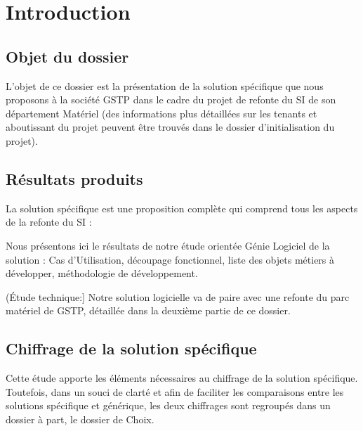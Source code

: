 \section{Introduction}


\subsection{Objet du dossier}

L'objet de ce dossier est la présentation de la solution spécifique que
nous proposons à la société GSTP dans le cadre du projet de refonte du SI
de son département Matériel (des informations plus détaillées sur les
tenants et aboutissant du projet peuvent être trouvés dans le dossier
d'initialisation du projet).


\subsection{Résultats produits}

La solution spécifique est une proposition complète qui comprend tous les
aspects de la refonte du SI :

\begin{description}

\item[Étude logicielle:]\el
Nous présentons ici le résultats de notre étude orientée Génie Logiciel de
la solution : Cas d'Utilisation, découpage fonctionnel, liste des objets
métiers à développer, méthodologie de développement.

\item(Étude technique:]\el
Notre solution logicielle va de paire avec une refonte du parc matériel de
GSTP, détaillée dans la deuxième partie de ce dossier.

\end{description}

\subsection{Chiffrage de la solution spécifique}

Cette étude apporte les éléments nécessaires au chiffrage de la solution
spécifique. Toutefois, dans un souci de clarté et afin de faciliter les
comparaisons entre les solutions spécifique et générique, les deux
chiffrages sont regroupés dans un dossier à part, le dossier de Choix.
